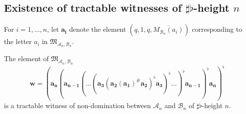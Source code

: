 \documentclass{lmcs}
\theoremstyle{remark}
\newcommand{\ideal}{\mathfrak{M}}
\newcommand{\autA}{\mathcal{A}}
\newcommand{\autB}{\mathcal{B}}
\theoremstyle{remark}
\begin{document}
\subsection{Existence of tractable witnesses of \texorpdfstring{$\sharp\flat$}{\#flat}-height \texorpdfstring{$n$}{n}}
\label{section:existence}

For $i=1, \ldots, n$, let $\boldsymbol{a_i}$ denote the element $(q,1,q,\overline{M_{\autB_n}(a_i)})$ corresponding to the letter $a_i$ in $\ideal_{\autA_n,\autB_n}$.

\begin{prop}
\label{prop:sfheightwitnessexists}
The element of $\ideal_{\autA_n,\autB_n}$ \[ \boldsymbol{w} = (\boldsymbol{a_n} (\boldsymbol{a_{n-1}} (\dots (\boldsymbol{a_{3}} ( \boldsymbol{a_{2}} (\boldsymbol{a_{1}})^\#\boldsymbol{a_{2}})^\flat \boldsymbol{a_{3}})^\flat \dots)^\flat \boldsymbol{a_{n-1}})^\flat \boldsymbol{a_{n}})^\flat\]  is a tractable witness of non-domination between $\autA_n$ and $\autB_n$ of $\sharp\flat$-height $n$.
\end{prop}
\end{document}
